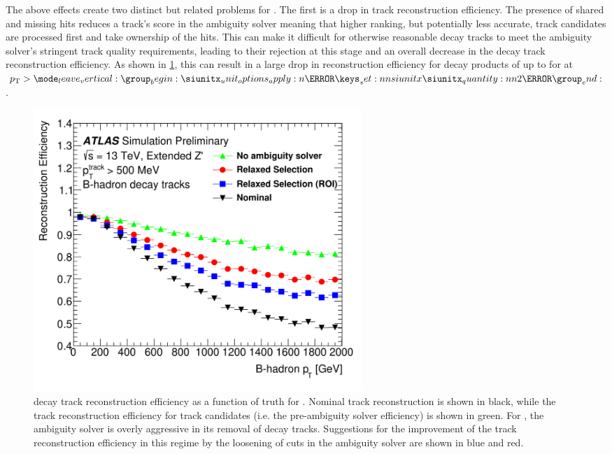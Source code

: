 The above effects create two distinct but related  problems for \btagging.
The first is a drop in track reconstruction efficiency.
The presence of shared and missing hits reduces a track's score in the ambiguity solver meaning that higher ranking, but potentially less accurate, track candidates are processed first and take ownership of the hits.
This can make it difficult for otherwise reasonable \bhadron decay tracks to meet the ambiguity solver's stringent track quality requirements, leading to their rejection at this stage and an overall decrease in the \bhadron decay track reconstruction efficiency.
As shown in \cref{fig:b_track_eff}, this can result in a large drop in reconstruction efficiency for \bhadron decay products of up to  for at $\pt > \SI{2}{\TeV}$.

\begin{figure}[!htbp]
  \centering
  \includegraphics[width=0.6\textwidth]{chapters/3.tracking/figs/b_track_reco_eff.png}
  \caption{
    \bhadron decay track reconstruction efficiency as a function of truth \bhadron \pt for \Zprimejets \cite{2022DonalTrackReco}.
    Nominal track reconstruction is shown in black, while the track reconstruction efficiency for track candidates (i.e. the pre-ambiguity solver efficiency) is shown in green.
    For \highpt \bhadrons, the ambiguity solver is overly aggressive in its removal of \bhadron decay tracks.
    Suggestions for the improvement of the track reconstruction efficiency in this regime by the loosening of cuts in the ambiguity solver are shown in blue and red.
  }
  \label{fig:b_track_eff}
\end{figure}

